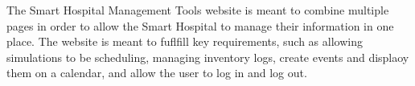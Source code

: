 The Smart Hospital Management Tools website is meant to combine multiple pages in order to allow the Smart Hospital to manage their information in one place. The website is meant to fuflfill key requirements, such as allowing simulations to be scheduling, managing inventory logs, create events and displaoy them on a calendar, and allow the user to log in and log out.